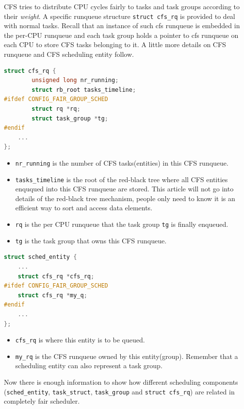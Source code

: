CFS tries to distribute CPU cycles fairly to tasks and task groups
according to their \emph{weight}. A specific runqueue structure
\texttt{struct cfs\_rq} is provided to deal with normal tasks.  Recall
that an instance of such cfs runqueue is embedded in the per-CPU
runqueue and each task group holds a pointer to cfs runqueue on each
CPU to store CFS tasks belonging to it.  A little more details on CFS
runqueue and CFS scheduling entity follow.
\begin{lstlisting}[language=C,
		caption={The CFS runqueue},
		label={lst:cfsrunqueue}]
struct cfs_rq {
        unsigned long nr_running;
        struct rb_root tasks_timeline;
#ifdef CONFIG_FAIR_GROUP_SCHED
        struct rq *rq;  
        struct task_group *tg;
#endif
	...
};
\end{lstlisting}
\begin{itemize}
\item \texttt{nr\_running} is the number of CFS tasks(entities) in this CFS 
	runqueue.
\item \texttt{tasks\_timeline} is the root of the red-black tree 
	\cite{rbtree} where 
	all CFS entities enququed into this CFS runqueue are stored. 
	This article will not go into details of the red-black tree
	mechanism, people only need to know it is an efficient way 
	to sort and access data elements.
\item \texttt{rq} is the per CPU runqueue that the task group \texttt{tg} 
	is finally enqueued.
\item \texttt{tg} is the task group that owns this CFS runqueue.
\end{itemize}
\begin{lstlisting}[language=C,
			caption={The CFS scheduling entity},
			label={lst:sched_entity}]
struct sched_entity {
	...
	struct cfs_rq *cfs_rq;
#ifdef CONFIG_FAIR_GROUP_SCHED
	struct cfs_rq *my_q;
#endif
	...
}; 
\end{lstlisting}
\begin{itemize}
\item \texttt{cfs\_rq} is where this entity is to be queued.
		
\item \texttt{my\_rq} is the CFS runqueue owned by this entity(group).
	Remember that a scheduling entity can also represent a task group.
\end{itemize}
Now there is enough information to show how different scheduling components
(\texttt{sched\_entity}, \texttt{task\_struct}, \texttt{task\_group}
and \texttt{struct cfs\_rq}) are related in completely fair scheduler.

